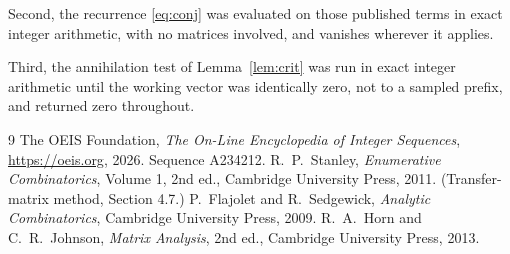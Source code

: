 \documentclass[11pt,a4paper]{article}
\theoremstyle{plain}
\theoremstyle{definition}
\begin{document}
Second, the recurrence \eqref{eq:conj} was evaluated on those published terms in exact
integer arithmetic, with no matrices involved, and vanishes wherever it applies.

Third, the annihilation test of Lemma~\ref{lem:crit} was run in exact integer arithmetic
until the working vector was identically zero, not to a sampled prefix, and returned zero
throughout.

\begin{thebibliography}{9}
 The OEIS Foundation, \emph{The On-Line Encyclopedia of Integer
Sequences}, \url{https://oeis.org}, 2026. Sequence A234212.
 R.~P.~Stanley, \emph{Enumerative Combinatorics}, Volume 1, 2nd ed.,
Cambridge University Press, 2011. (Transfer-matrix method, Section 4.7.)
 P.~Flajolet and R.~Sedgewick, \emph{Analytic Combinatorics}, Cambridge
University Press, 2009.
 R.~A.~Horn and C.~R.~Johnson, \emph{Matrix Analysis}, 2nd ed., Cambridge
University Press, 2013.
\end{thebibliography}
\end{document}
